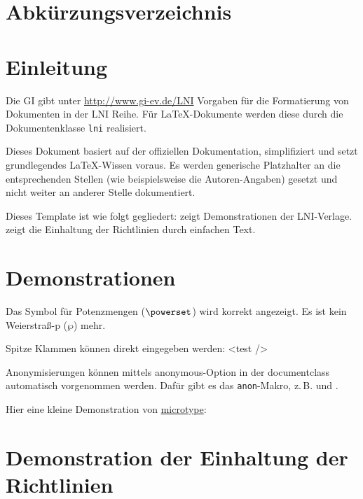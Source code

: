 \documentclass[biblatex]{lni}
\begin{document}
  \tableofcontents
  \listoffigures
  \newpage

  \section*{Abkürzungsverzeichnis}
  \begin{acronym}[Bash]
  \end{acronym}
  \newpage

  \section{Einleitung}
  Die GI gibt unter \url{http://www.gi-ev.de/LNI} Vorgaben für die Formatierung von Dokumenten in der LNI Reihe.
  Für \LaTeX-Dokumente werden diese durch die Dokumentenklasse \texttt{lni} realisiert.

  Dieses Dokument basiert auf der offiziellen Dokumentation, simplifiziert und setzt grundlegendes LaTeX-Wissen voraus.
  Es werden generische Platzhalter an die entsprechenden Stellen (wie beispielsweise die Autoren-Angaben) gesetzt und nicht weiter an anderer Stelle dokumentiert.

  Dieses Template ist wie folgt gegliedert:
   zeigt Demonstrationen der LNI-Verlage.
   zeigt die Einhaltung der Richtlinien durch einfachen Text.

  \section{Demonstrationen}
  \label{sec:demos}
  Das Symbol für Potenzmengen ($\powerset$) wird korrekt angezeigt.
  Es ist kein Weierstraß-p ($\wp$) mehr.

  Spitze Klammen können direkt eingegeben werden: <test />

  Anonymisierungen können mittels anonymous-Option in der documentclass automatisch vorgenommen werden. Dafür gibt es das \texttt{anon}-Makro, z.\,B.  und .

  Hier eine kleine Demonstration von \href{https://www.ctan.org/pkg/microtype}{microtype}:
  \blindtext

  \section{Demonstration der Einhaltung der Richtlinien}
  \label{sec:lniconformance}
\end{document}
